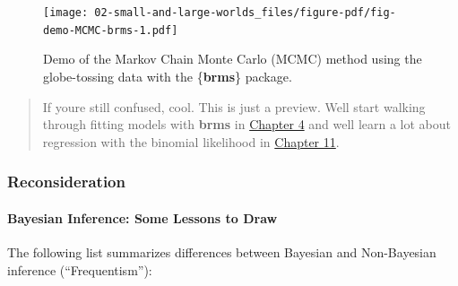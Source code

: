 \documentclass[
  letterpaper,
  DIV=11,
  numbers=noendperiod]{scrreprt}
\let\oldparagraph\paragraph
\renewcommand{\paragraph}[1]{\oldparagraph{#1}\mbox{}}
\begin{document}
\begin{figure}[H]

{\centering \texttt{[image: 02-small-and-large-worlds\_files/figure-pdf/fig-demo-MCMC-brms-1.pdf]}

}

\caption{\label{fig-demo-MCMC-brms}Demo of the Markov Chain Monte Carlo
(MCMC) method using the globe-tossing data with the \{\textbf{brms}\}
package.}

\end{figure}

\begin{quote}
If you\textquotesingle re still confused, cool. This is just a preview.
We\textquotesingle ll start walking through fitting models with
\textbf{brms} in
\href{https://bookdown.org/content/4857/geocentric-models.html\#geocentric-models}{Chapter
4} and we\textquotesingle ll learn a lot about regression with the
binomial likelihood in
\href{https://bookdown.org/content/4857/god-spiked-the-integers.html\#god-spiked-the-integers}{Chapter
11}.
\end{quote}

\hypertarget{reconsideration-1}{%
\subsubsection{Reconsideration}\label{reconsideration-1}}

\hypertarget{bayesian-inference-some-lessons-to-draw}{%
\paragraph{Bayesian Inference: Some Lessons to
Draw}\label{bayesian-inference-some-lessons-to-draw}}

The following list summarizes differences between Bayesian and
Non-Bayesian inference (``Frequentism''):
\end{document}
